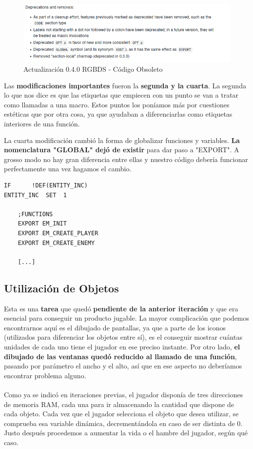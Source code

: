 \begin{figure}[h]
\centering
\includegraphics[width=1\textwidth]{include/images/desarrollo/rgbdsupdate.png}
\caption{Actualización 0.4.0 RGBDS - Código Obsoleto}
\label{figure:rgbdsupdate}
\end{figure}

Las \textbf{modificaciones importantes} fueron la \textbf{segunda y la cuarta}. La segunda lo que nos dice es que las etiquetas que empiecen con un punto se van a tratar como llamadas a una macro. Estos puntos los poníamos más por cuestiones estéticas que por otra cosa, ya que ayudaban a diferenciarlas como etiquetas interiores de una función.

\clearpage

La cuarta modificación cambió la forma de globalizar funciones y variables. \textbf{La nomenclatura "GLOBAL" dejó de existir} para dar paso a "EXPORT". A grosso modo no hay gran diferencia entre ellas y nuestro código debería funcionar perfectamente una vez hagamos el cambio.

\begin{lstlisting}[caption={Cambio de GLOBAL por EXPORT}, label={code:export}]
IF      !DEF(ENTITY_INC)
ENTITY_INC  SET  1

	;FUNCTIONS
	EXPORT EM_INIT
	EXPORT EM_CREATE_PLAYER
	EXPORT EM_CREATE_ENEMY

	[...]
\end{lstlisting}

\subsection{Utilización de Objetos}

Esta es una \textbf{tarea} que quedó \textbf{pendiente de la anterior iteración} y que era esencial para conseguir un producto jugable. La mayor complicación que podemos encontrarnos aquí es el dibujado de pantallas, ya que a parte de los iconos (utilizados para diferenciar los objetos entre sí), es el conseguir mostrar cuántas unidades de cada uno tiene el jugador en ese preciso instante. Por otro lado, \textbf{el dibujado de las ventanas quedó reducido al llamado de una función}, pasando por parámetro el ancho y el alto, así que en ese aspecto no deberíamos encontrar problema alguno.
\\ \\
Como ya se indicó en iteraciones previas, el jugador disponía de tres direcciones de memoria RAM, cada una para ir almacenando la cantidad que dispone de cada objeto. Cada vez que el jugador selecciona el objeto que desea utilizar, se comprueba esa variable dinámica, decrementándola en caso de ser distinta de 0. Justo después procedemos a aumentar la vida o el hambre del jugador, según qué caso.

